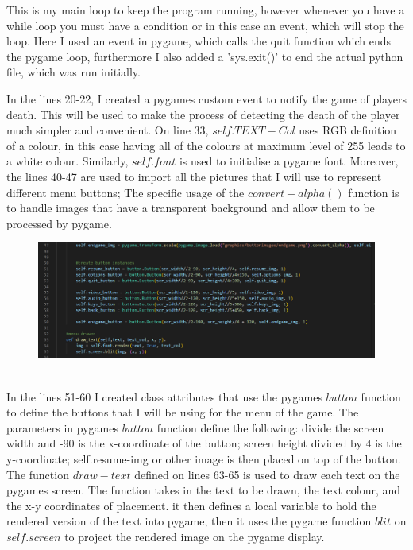\documentclass[12pt]{article}
\begin{document}
This is my main loop to keep the program running, however whenever you have a while loop you must have a condition or in this case an event, which will stop the loop. Here I used an event in pygame, which calls the quit function which ends the pygame loop, furthermore I also added a 'sys.exit()' to end the actual python file, which was run initially.

In the lines 20-22, I created a pygames custom event to notify the game of players death. This will be used to make the process of detecting the death of the player much simpler and convenient. On line 33, $self.TEXT-Col$ uses RGB definition of a colour, in this case having all of the colours at maximum level of 255 leads to a white colour. Similarly, $self.font$ is used to initialise a pygame font. Moreover, the lines 40-47 are used to import all the pictures that I will use to represent different menu buttons; The specific usage of the $convert-alpha()$ function is to handle images that have a transparent background and allow them to be processed by pygame.\\
\begin{figure}[H]
    \includegraphics[width = 18cm]{game class/main2.PNG}
    \centering
\end{figure}
\vspace{3em}\\
In the lines 51-60 I created class attributes that use the pygames $button$ function to define the buttons that I will be using for the menu of the game. The parameters in pygames $button$ function define the following: divide the screen width and -90 is the x-coordinate of the button; screen height divided by 4 is the y-coordinate; self.resume-img or other image is then placed on top of the button. \\
The function $draw-text$ defined on lines 63-65 is used to draw each text on the pygames screen. The function takes in the text to be drawn, the text colour, and the x-y coordinates of placement. it then defines a local variable to hold the rendered version of the text into pygame, then it uses the pygame function $blit$ on $self.screen$ to project the rendered image on the pygame display.
\end{document}
